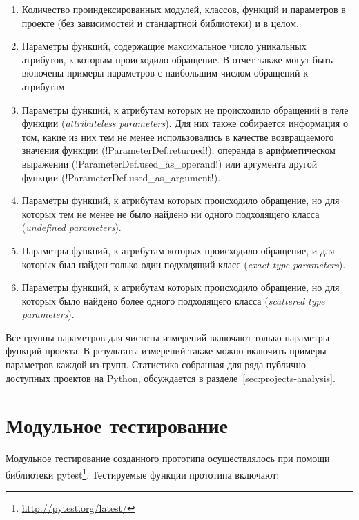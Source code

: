 \begin{enumerate}
  \item Количество проиндексированных модулей, классов, функций и параметров в
    проекте (без зависимостей и стандартной библиотеки) и в целом.

  \item Параметры функций, содержащие максимальное число уникальных атрибутов, к
    которым происходило обращение. В отчет также могут быть включены примеры
    параметров с наибольшим числом обращений к атрибутам.

  \item Параметры функций, к атрибутам которых не происходило обращений в теле
    функции (\emph{attributeless parameters}). Для них также
    собирается информация о том, какие из них тем не менее использовались в
    качестве возвращаемого значения функции (!ParameterDef.returned!), операнда
    в арифметическом выражении (!ParameterDef.used_as_operand!) или аргумента
    другой функции (!ParameterDef.used_as_argument!).

  \item Параметры функций, к атрибутам которых происходило обращение, но для
    которых тем не менее не было найдено ни одного подходящего класса
    (\emph{undefined parameters}).

  \item Параметры функций, к атрибутам которых происходило обращение, и для
    которых был найден только один подходящий класс (\emph{exact type parameters}).

  \item Параметры функций, к атрибутам которых происходило обращение, но для
    которых было найдено более одного подходящего класса (\emph{scattered type
      parameters}).

\end{enumerate}

Все группы параметров для чистоты измерений включают только параметры функций
проекта. В результаты измерений также можно включить примеры параметров каждой из
групп. Статистика собранная для ряда публично доступных проектов на Python,
обсуждается в разделе~\ref{sec:projects-analysis}.

\section{Модульное тестирование}
\label{sec:unit-testing}

Модульное тестирование созданного прототипа осуществлялось при помощи библиотеки
pytest\footnote{\url{http://pytest.org/latest/}}.  Тестируемые функции прототипа
включают:

